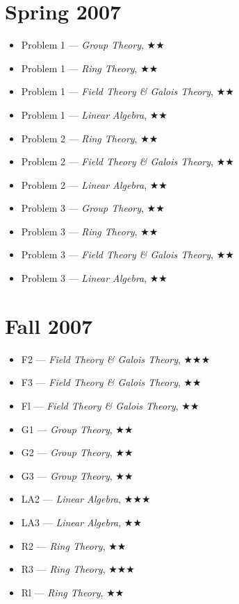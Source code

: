 \documentclass[11pt,letterpaper]{book}
\begin{document}
\section*{Spring 2007}
\begin{itemize}
\item Problem 1 --- \textit{Group Theory}, $\bigstar\bigstar$
\item Problem 1 --- \textit{Ring Theory}, $\bigstar\bigstar$
\item Problem 1 --- \textit{Field Theory \& Galois Theory}, $\bigstar\bigstar$
\item Problem 1 --- \textit{Linear Algebra}, $\bigstar\bigstar$
\item Problem 2 --- \textit{Ring Theory}, $\bigstar\bigstar$
\item Problem 2 --- \textit{Field Theory \& Galois Theory}, $\bigstar\bigstar$
\item Problem 2 --- \textit{Linear Algebra}, $\bigstar\bigstar$
\item Problem 3 --- \textit{Group Theory}, $\bigstar\bigstar$
\item Problem 3 --- \textit{Ring Theory}, $\bigstar\bigstar$
\item Problem 3 --- \textit{Field Theory \& Galois Theory}, $\bigstar\bigstar$
\item Problem 3 --- \textit{Linear Algebra}, $\bigstar\bigstar$
\end{itemize}

\section*{Fall 2007}
\begin{itemize}
\item F2 --- \textit{Field Theory \& Galois Theory}, $\bigstar\bigstar\bigstar$
\item F3 --- \textit{Field Theory \& Galois Theory}, $\bigstar\bigstar$
\item Fl --- \textit{Field Theory \& Galois Theory}, $\bigstar\bigstar$
\item G1 --- \textit{Group Theory}, $\bigstar\bigstar$
\item G2 --- \textit{Group Theory}, $\bigstar\bigstar$
\item G3 --- \textit{Group Theory}, $\bigstar\bigstar$
\item LA2 --- \textit{Linear Algebra}, $\bigstar\bigstar\bigstar$
\item LA3 --- \textit{Linear Algebra}, $\bigstar\bigstar$
\item R2 --- \textit{Ring Theory}, $\bigstar\bigstar$
\item R3 --- \textit{Ring Theory}, $\bigstar\bigstar\bigstar$
\item Rl --- \textit{Ring Theory}, $\bigstar\bigstar$
\end{itemize}
\end{document}
